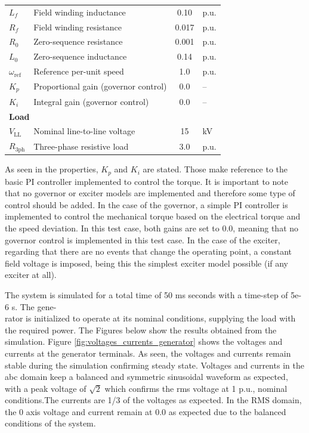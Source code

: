 \begin{table}[htbp]
\begin{tabular}{|l|l|c|l|}
$L_f$ & Field winding inductance & 0.10 & p.u. \\
$R_f$ & Field winding resistance & 0.017 & p.u. \\
$R_0$ & Zero-sequence resistance & 0.001 & p.u. \\
$L_0$ & Zero-sequence inductance & 0.14 & p.u. \\
$\omega_\text{ref}$ & Reference per-unit speed & 1.0 & p.u. \\
$K_p$ & Proportional gain (governor control) & 0.0 & -- \\
$K_i$ & Integral gain (governor control) & 0.0 & -- \\
\hline
\multicolumn{4}{|l|}{\textbf{Load}} \\
\hline
$V_\text{LL}$ & Nominal line-to-line voltage & 15 & kV \\
$R_\text{3ph}$ & Three-phase resistive load & 3.0 & p.u. \\
\hline
\end{tabular}
\end{table}

As seen in the properties, $K_p$ and $K_i$ are stated. Those make reference to the basic PI controller implemented to control the torque. It is important to note that no governor or exciter models are implemented and therefore 
some type of control should be added. In the case of the governor, a simple PI controller is implemented to control the mechanical torque based on the electrical torque and the speed deviation. In this test case, both gains
are set to 0.0, meaning that no governor control is implemented in this test case. In the case of the exciter, regarding that there are no events that change the operating point, a constant field voltage is imposed, being this the simplest
exciter model possible (if any exciter at all).

The system is simulated for a total time of 50 ms seconds with a time-step of 5e-6 s. The gene-\\rator is initialized to operate at its nominal conditions, supplying the load with the required power. The Figures below show the results
obtained from the simulation. 
Figure \ref{fig:voltages_currents_generator} shows the voltages and currents at the generator terminals. As seen, the voltages and currents remain stable during the simulation confirming steady state. Voltages and currents in the abc domain keep a 
balanced and symmetric sinusoidal waveform as expected, with a peak voltage of $\sqrt{2}$ which confirms the rms voltage at 1 p.u., nominal conditions.The currents are 1/3 of the voltages as expected. In the RMS domain, the 0 axis voltage and current 
remain at 0.0 as expected due to the balanced conditions of the system.



